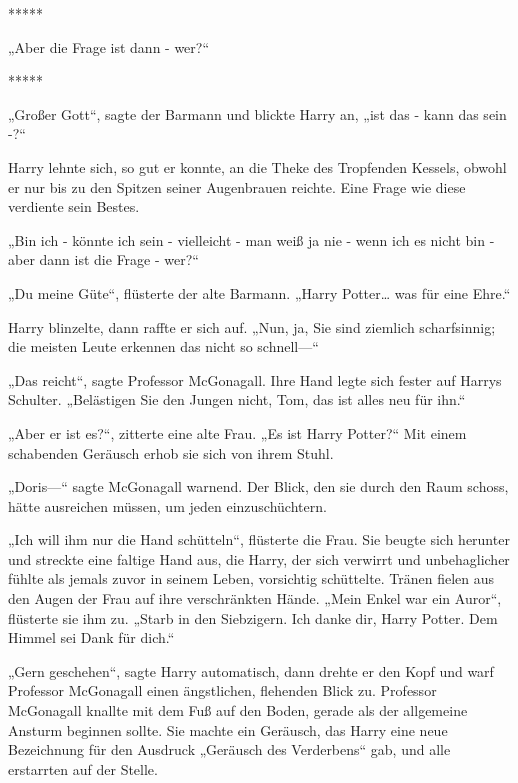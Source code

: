 

\hypertarget{die-realituxe4t-mit-ihren-alternativen-vergleichen}{%

*****

„Aber die Frage ist dann - wer?“ ~

*****

„Großer Gott“, sagte der Barmann und blickte Harry an, „ist das - kann das sein -?“

Harry lehnte sich, so gut er konnte, an die Theke des Tropfenden Kessels, obwohl er nur bis zu den Spitzen seiner Augenbrauen reichte. Eine Frage wie diese verdiente sein Bestes.

„Bin ich - könnte ich sein - vielleicht - man weiß ja nie - wenn ich es nicht bin - aber dann ist die Frage - wer?“

„Du meine Güte“, flüsterte der alte Barmann. „Harry Potter… was für eine Ehre.“

Harry blinzelte, dann raffte er sich auf. „Nun, ja, Sie sind ziemlich scharfsinnig; die meisten Leute erkennen das nicht so schnell—“

„Das reicht“, sagte Professor McGonagall. Ihre Hand legte sich fester auf Harrys Schulter. „Belästigen Sie den Jungen nicht, Tom, das ist alles neu für ihn.“

„Aber er ist es?“, zitterte eine alte Frau. „Es ist Harry Potter?“ Mit einem schabenden Geräusch erhob sie sich von ihrem Stuhl.

„Doris—“ sagte McGonagall warnend. Der Blick, den sie durch den Raum schoss, hätte ausreichen müssen, um jeden einzuschüchtern.

„Ich will ihm nur die Hand schütteln“, flüsterte die Frau. Sie beugte sich herunter und streckte eine faltige Hand aus, die Harry, der sich verwirrt und unbehaglicher fühlte als jemals zuvor in seinem Leben, vorsichtig schüttelte. Tränen fielen aus den Augen der Frau auf ihre verschränkten Hände. „Mein Enkel war ein Auror“, flüsterte sie ihm zu. „Starb in den Siebzigern. Ich danke dir, Harry Potter. Dem Himmel sei Dank für dich.“

„Gern geschehen“, sagte Harry automatisch, dann drehte er den Kopf und warf Professor McGonagall einen ängstlichen, flehenden Blick zu. Professor McGonagall knallte mit dem Fuß auf den Boden, gerade als der allgemeine Ansturm beginnen sollte. Sie machte ein Geräusch, das Harry eine neue Bezeichnung für den Ausdruck „Geräusch des Verderbens“ gab, und alle erstarrten auf der Stelle.

}
